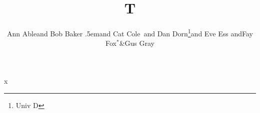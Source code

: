 \documentclass{article}
\newcommand\ns{\kern.5em\relax}
\begin{document}
\title{T}
\author{Ann Able\space and Bob Baker \ns and Cat Cole\
and Dan Dorn\thanks{Univ D}and Eve Ess and\;Fay Fox$^\ast$\&Gus Gray}
\maketitle
x
\end{document}
